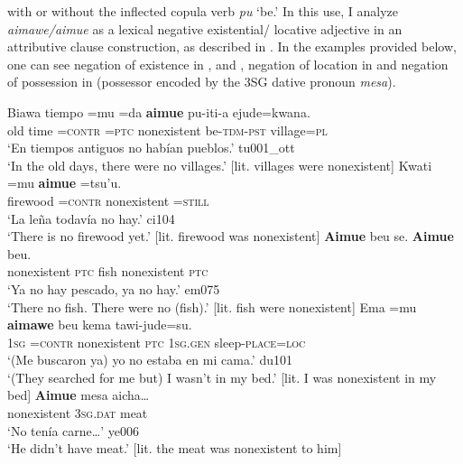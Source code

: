 \documentclass[output=paper]{langsci/langscibook}
\begin{document}
with or without the inflected copula verb \textit{pu} `be.' In this use, I
analyze \textit{aimawe\slash aimue} as a lexical negative existential\slash
locative adjective in an attributive clause construction, as described in
. In the examples provided below, one can see
negation of existence in ,  and , negation of location in
 and negation of possession in  (possessor encoded by the 3SG dative pronoun \textit{mesa}).
%
\begin{exe}\ex\label{ex:tacana-villages-firewood}\begin{xlist}
\ex\label{ex:tacana-villages}
\gll {\ob}Biawa tiempo{\cb} =mu =da \textbf{aimue}
pu-iti-a ejude=kwana.\\
    old  time  =\textsc{contr}  \textsc{=ptc}  nonexistent
    be-\textsc{tdm-pst}  village=\textsc{pl}\\
\glt `En tiempos antiguos no habían pueblos.' tu001\_ott\\
`In the old days, there were no villages.' [lit. villages were nonexistent]
\ex\label{ex:tacana-firewood}
\gll {}Kwati  =mu
\textbf{aimue}  =tsu'u.\\
    firewood  =\textsc{contr}  nonexistent  =\textsc{still}\\
\glt `La leña todavía no hay.' ci104\\
`There is no firewood yet.' [lit. firewood was nonexistent]
\ex\label{ex:tacana-nofish}
\gll {}\textbf{Aimue}  beu se.
\textbf{Aimue}  beu.\\
    nonexistent  \textsc{ptc}  fish  nonexistent  \textsc{ptc}\\
\glt `Ya no hay pescado, ya no hay.' em075\\
`There no fish. There were no (fish).' [lit. fish were nonexistent]
\ex\label{ex:tacana-mybed}
\gll 
  Ema  =mu \textbf{aimawe}  beu
  kema tawi-jude=su{\cb}.\\
    \textsc{1sg}  \textsc{=contr}  nonexistent  \textsc{ptc}
    \textsc{1sg.gen}  sleep-\textsc{place=loc}\\
\glt `(Me buscaron ya) yo no estaba en mi cama.' du101\\
`(They searched for me but) I wasn't in my bed.' [lit. I was nonexistent in my bed]
\ex\label{ex:tacana-no-meat}
\gll 
  \textbf{Aimue} mesa aicha…\\
    nonexistent  \textsc{3sg.dat}  meat\\
\glt `No tenía carne…' ye006\\
`He didn't have meat.' [lit. the meat was nonexistent to him]
\end{xlist}\end{exe}
\end{document}
